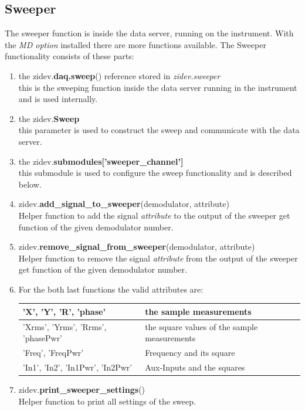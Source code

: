 \documentclass[11pt]{article} %
\begin{document}
\subsection{Sweeper}\label{lblsweep}
The sweeper function is inside the data server, running on the instrument. With the {\it MD option} installed there are more functions available. The Sweeper functionality consists of these parts:
\begin{enumerate}
\item the zidev.{\bf daq.sweep}() reference stored in {\it zidev.sweeper} \\
	this is the sweeping function inside the data server running in the instrument and is used internally.
\item the zidev.{\bf Sweep} \\
	this parameter is used to construct the sweep and communicate with the data server.
\item the zidev.{\bf submodules['sweeper\_channel']} \\
	this submodule is used to configure the sweep functionality and is described below.

\item zidev.{\bf add\_signal\_to\_sweeper}(demodulator, attribute) \\
	Helper function to add the signal {\it attribute} to the output of the sweeper get function of the given demodulator number.
\item zidev.{\bf remove\_signal\_from\_sweeper}(demodulator, attribute) \\
	Helper function to remove the signal {\it attribute} from the output of the sweeper get function of the given demodulator number.
\item[] For the both last functions the valid attributes are:\label{sweepresult} \\[-0.5em]
	\setlength{\LTleft}{1.5cm}
	\begin{longtable}{|p{6cm}|p{8.5cm}|}
	\hline
	'X', 'Y', 'R', 'phase' & the sample measurements \\ \hline
	'Xrms', 'Yrms', 'Rrms', 'phasePwr' & the square values of the sample measurements \\ \hline
	'Freq', 'FreqPwr' & Frequency and its square \\ \hline
	'In1', 'In2', 'In1Pwr', 'In2Pwr' & Aux-Inputs and the squares \\ \hline
	\end{longtable}

\item zidev.{\bf print\_sweeper\_settings}() \\
	Helper function to print all settings of the sweep.

\end{enumerate}
\end{document}
